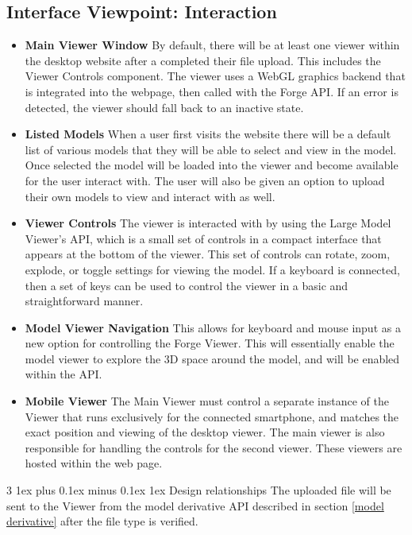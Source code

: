 \documentclass[letterpaper, 10pt, draftclsnofoot, compsoc, onecolumn]{IEEEtran}
\makeatletter
\def\subsubsection{\@startsection{subsubsection}%
                                 {3}%
                                 {\z@}%
                                 {1ex plus 0.1ex minus 0.1ex}%
                                 {1ex}%
                                 {\normalfont\normalsize}}%
\makeatother
\begin{document}
\subsection{Interface Viewpoint: Interaction}
\begin{itemize}
	\item[]\textbf{Main Viewer Window} By default, there will be at least one viewer within the desktop website after a completed their file upload.  This includes the Viewer Controls component. The viewer uses a WebGL graphics backend that is integrated into the webpage, then called with the Forge API. If an error is detected, the viewer should fall back to an inactive state.

	\item[]\textbf{Listed Models} When a user first visits the website there will be a default list of various models that they will be able to select and view in the model. Once selected the model will be loaded into the viewer and become available for the user interact with. The user will also be given an option to upload their own models to view and interact with as well. 
	
	\item[]\textbf{Viewer Controls} The viewer is interacted with by using the Large Model Viewer's API, which is a small set of controls in a compact interface that appears at the bottom of the viewer. This set of controls can rotate, zoom, explode, or toggle settings for viewing the model. If a keyboard is connected, then a set of keys can be used to control the viewer in a basic and straightforward manner.
	
	\item[]\textbf{Model Viewer Navigation} This allows for keyboard and mouse input as a new option for controlling the Forge Viewer. This will essentially enable the model viewer to explore the 3D space around the model, and will be enabled within the API.

	\item[]\textbf{Mobile Viewer} The Main Viewer must control a separate instance of the Viewer that runs exclusively for the connected smartphone, and matches the exact position and viewing of the desktop viewer. The main viewer is also responsible for handling the controls for the second viewer. These viewers are hosted within the web page.
	

\end{itemize}
\subsubsection{Design relationships}
	The uploaded file will be sent to the Viewer from the model derivative API described in section \ref{model derivative} after the file type is verified.
	
\end{document}
